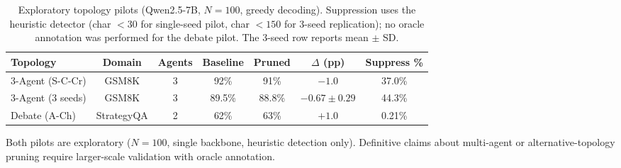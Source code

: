 \begin{table}[ht]
\centering
\caption{Exploratory topology pilots (Qwen2.5-7B, $N = 100$, greedy decoding). Suppression uses the heuristic detector (char $< 30$ for single-seed pilot, char $< 150$ for 3-seed replication); no oracle annotation was performed for the debate pilot. The 3-seed row reports mean $\pm$ SD.}
\label{tab:pilot_results}
\small
\begin{tabular}{lcccccc}
\toprule
Topology & Domain & Agents & Baseline & Pruned & $\Delta$ (pp) & Suppress \% \\
\midrule
3-Agent (S-C-Cr) & GSM8K & 3 & 92\% & 91\% & $-1.0$ & 37.0\% \\
3-Agent (3 seeds) & GSM8K & 3 & 89.5\% & 88.8\% & $-0.67 \pm 0.29$ & 44.3\% \\
Debate (A-Ch) & StrategyQA & 2 & 62\% & 63\% & $+1.0$ & 0.21\% \\
\bottomrule
\end{tabular}
\end{table}

Both pilots are exploratory ($N = 100$, single backbone, heuristic detection only). Definitive claims about multi-agent or alternative-topology pruning require larger-scale validation with oracle annotation.
